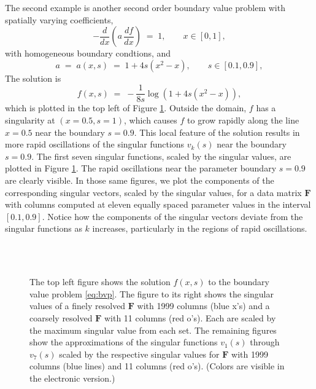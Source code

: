 \documentclass[final]{siamltex}
\providecommand{\mat}[1]{\boldsymbol{#1}}
\providecommand{\mF}{\ensuremath{\mat{F}}}
\begin{document}
The second example is another second order boundary value problem with
spatially varying coefficients,
\begin{equation}
\label{eq:bvp}
-\frac{d}{dx} \left(a\,\frac{df}{dx} \right) \;=\; 1,\qquad x\in[0,1],
\end{equation}
with homogeneous boundary condtions, and
\begin{equation}
a \;=\; a(x,s) \;=\; 1 + 4s(x^2-x),\qquad s\in[0.1,0.9],
\end{equation}
The solution is
\begin{equation}
\label{eq:toysoln}
f(x,s) \;=\; -\frac{1}{8s}\log\left( 1+ 4s(x^2-x)\right),
\end{equation}
which is plotted in the top left of Figure \ref{fig:svecs1}.  Outside
the domain, $f$ has a singularity at $(x=0.5,s=1)$, which causes $f$
to grow rapidly along the line $x=0.5$ near the boundary $s=0.9$. This
local feature of the solution results in more rapid oscillations of
the singular functions $v_k(s)$ near the boundary $s=0.9$. The first
seven singular functions, scaled by the singular values, are plotted
in Figure \ref{fig:svecs1}. The rapid oscillations near the parameter
boundary $s=0.9$ are clearly visible.  In those same figures, we plot
the components of the corresponding singular vectors, scaled by the
singular values, for a data matrix $\mF$ with columns computed at
eleven equally spaced parameter values in the interval
$[0.1,0.9]$. Notice how the components of the singular vectors deviate
from the singular functions as $k$ increases, particularly in the
regions of rapid oscillations.

\begin{figure}[ht]
\centering
{}\;
\;
\\
\;
\;
\\
\;
\;
\caption{The top left figure shows the solution $f(x,s)$ to the
  boundary value problem \eqref{eq:bvp}. The figure to its right shows the
  singular values of a finely resolved $\mF$ with 1999 columns (blue
  x's) and a coarsely resolved $\mF$ with 11 columns (red o's). Each
  are scaled by the maximum singular value from each set. The
  remaining figures show the approximations of the singular functions
  $v_1(s)$ through $v_7(s)$ scaled by the respective singular values
  for $\mF$ with 1999 columns (blue lines) and 11 columns (red
  o's). (Colors are visible in the electronic version.) }
\label{fig:svecs1}
\end{figure}
\end{document}
